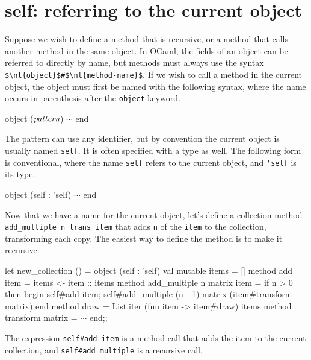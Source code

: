 \section{self: referring to the current object}

\label{objects:self}
\label{keyword:hash}
Suppose we wish to define a method that is recursive, or a method that calls another method in the same
object.  In OCaml, the fields of an object can be referred to directly by name, but methods must
always use the syntax \hbox{\lstinline/$\nt{object}$#$\nt{method-name}$/}.  If we wish to call a method in
the current object, the object must first be named with the following syntax, where the name occurs in
parenthesis after the \hbox{\lstinline/object/} keyword.

\begin{ocaml}
object ($\textit{\rmfamily pattern}$) $\cdots$ end
\end{ocaml}
%
The pattern can use any identifier, but by convention the current object is usually
named \hbox{\lstinline/self/}.  It is often specified with a type as well.  The following form is conventional,
where the name \hbox{\lstinline/self/} refers to the current object, and \hbox{\lstinline/'self/} is its type.

\begin{ocaml}
object (self : 'self) $\cdots$ end
\end{ocaml}
%
Now that we have a name for the current object, let's define a collection method
\hbox{\lstinline/add_multiple n trans item/} that adds \hbox{\lstinline/n/} of the \hbox{\lstinline/item/}
to the collection, transforming each copy.  The easiest way to define the method is to make it
recursive.

\begin{ocaml}
let new_collection () =
   object (self : 'self)
      val mutable items = []
      method add item = items <- item :: items
      method add_multiple n matrix item =
         if n > 0 then begin
            self#add item;
            self#add_multiple (n - 1) matrix (item#transform matrix)
         end
      method draw = List.iter (fun item -> item#draw) items
      method transform matrix = $\cdots$
   end;;
\end{ocaml}
%
The expression \hbox{\lstinline/self#add item/} is a method call that adds the item to the current
collection, and \hbox{\lstinline/self#add_multiple/} is a recursive call.

